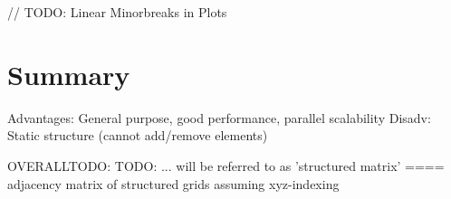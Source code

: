 \documentclass{article}
\begin{document}
    // TODO: Linear Minorbreaks in Plots
\section{Summary}
  Advantages: General purpose, good performance, parallel scalability
  Disadv: Static structure (cannot add/remove elements)

OVERALLTODO:
  TODO: ... will be referred to as 'structured matrix' ==== adjacency matrix of structured grids assuming xyz-indexing
\printbibliography
\end{document}
